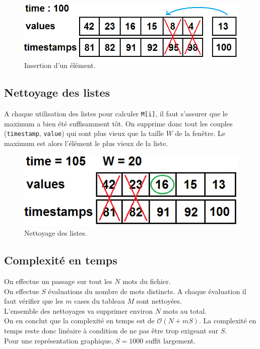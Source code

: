 \documentclass[12pt,a4paper,titlepage]{article}
\newcommand{\class}[1]{\texttt{#1}}
\begin{document}
\begin{figure}[!h]
	\centering
	\includegraphics[scale=0.5]{pictures/picSlidingWindow2.png}
	\caption{Insertion d'un élément.}
\end{figure}

\newpage
\subsection{Nettoyage des listes}
A chaque utilisation des listes pour calculer \class{M[i]}, il faut s'assurer que le maximum a bien été suffisamment tôt. On supprime donc tout les couples (\class{timestamp}, \class{value}) qui sont plus vieux que la taille $W$ de la fenêtre. Le maximum est alors l'élément le plus vieux de la liste.

\begin{figure}[!h]
	\centering
	\includegraphics[scale=0.5]{pictures/picSlidingWindow1.png}
	\caption{Nettoyage des listes.}
\end{figure}

\subsection{Complexité en temps}
On effectue un passage sur tout les $N$ mots du fichier.\\
On effectue $S$ évaluations du nombre de mots distincts. A chaque évaluation il faut vérifier que les $m$ cases du tableau $M$ sont nettoyées.\\
L'ensemble des nettoyages va supprimer environ $N$ mots au total.\\

On en conclut que la complexité en temps est de $\mathcal{O}(N + mS)$. La complexité en temps reste donc linéaire à condition de ne pas être trop exigeant sur $S$.\\
Pour une représentation graphique, $S=1000$ suffit largement.
\end{document}
